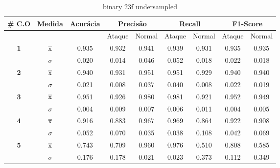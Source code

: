 \begin{table}[htb]
    \centering
    \begin{tabular}{c|c|c|cc|cc|cc}
        \hline
        \# \textbf{C.O} & \textbf{Medida} & \textbf{Acurácia} & \multicolumn{2}{c|}{ \textbf{Precisão} } & \multicolumn{2}{c|}{ \textbf{Recall} } & \multicolumn{2}{c}{ \textbf{F1-Score} } \\
        \hline
        & & & Ataque & Normal & Ataque & Normal & Ataque & Normal \\
        \hline
        \multirow{2}{*}{ \textbf{1} } & $ \overline{\rm x} $ & 0.935 & 0.932 & 0.941 & 0.939 & 0.931 & 0.935 & 0.935 \\
        & $\sigma$ & 0.020 & 0.014 & 0.046 & 0.052 & 0.018 & 0.022 & 0.018 \\
        \hline
        \multirow{2}{*}{ \textbf{2} } & $ \overline{\rm x} $ & 0.940 & 0.931 & 0.951 & 0.951 & 0.929 & 0.940 & 0.940 \\
        & $\sigma$ & 0.021 & 0.008 & 0.037 & 0.040 & 0.008 & 0.022 & 0.019 \\
        \hline
        \multirow{2}{*}{ \textbf{3} } & $ \overline{\rm x} $ & 0.951 & 0.926 & 0.980 & 0.981 & 0.921 & 0.952 & 0.949 \\
        & $\sigma$ & 0.004 & 0.009 & 0.007 & 0.006 & 0.011 & 0.004 & 0.005 \\
        \hline
        \multirow{2}{*}{ \textbf{4} } & $ \overline{\rm x} $ & 0.916 & 0.883 & 0.967 & 0.969 & 0.864 & 0.922 & 0.908 \\
        & $\sigma$ & 0.052 & 0.070 & 0.035 & 0.038 & 0.108 & 0.042 & 0.069 \\
        \hline
        \multirow{2}{*}{ \textbf{5} } & $ \overline{\rm x} $ & 0.743 & 0.709 & 0.960 & 0.976 & 0.510 & 0.808 & 0.585 \\
        & $\sigma$ & 0.176 & 0.178 & 0.021 & 0.023 & 0.373 & 0.112 & 0.349 \\
        \hline
    \end{tabular} 
    \caption{binary 23f undersampled}
\end{table}

